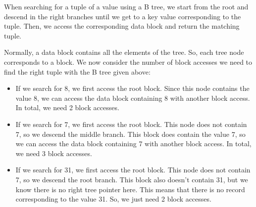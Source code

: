 \documentclass[a4paper, openany]{memoir}
\begin{document}
When searching for a tuple of a value using a B tree, we start from the root and descend in the right branches until we get to a key value corresponding to the tuple. Then, we access the corresponding data block and return the matching tuple. 

Normally, a data block contains all the elements of the tree. So, each tree node corresponds to a block. We now consider the number of block accesses we need to find the right tuple with the B tree given above:
\begin{itemize}
    \item If we search for 8, we first access the root block. Since this node contains the value 8, we can access the data block containing 8 with another block access. In total, we need 2 block accesses.
    \item If we search for 7, we first access the root block. This node does not contain 7, so we descend the middle branch. This block does contain the value 7, so we can access the data block containing 7 with another block access. In total, we need 3 block accesses.
    \item If we search for 31, we first access the root block. This node does not contain 7, so we descend the root branch. This block also doesn't contain 31, but we know there is no right tree pointer here. This means that there is no record corresponding to the value 31. So, we just need 2 block accesses.
\end{itemize}

\end{document}
